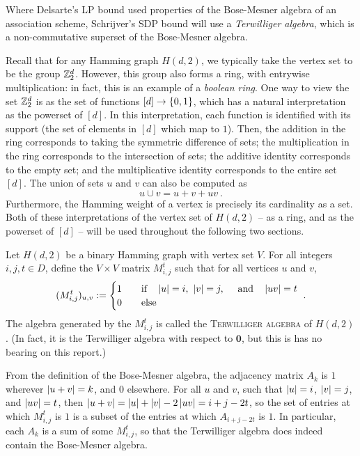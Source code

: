 \documentclass{report}
\newcommand{\wt}[1]{\abs{ #1 }}
\newcommand{\vzero}{\mathbf{0}}
\newcommand{\Mijt}{M_{i, j}^t}
\begin{document}
    Where Delsarte's LP bound used properties of the Bose-Mesner algebra of an
    association scheme, Schrijver's SDP bound will use a \textit{Terwilliger
    algebra}, which is a non-commutative superset of the Bose-Mesner algebra.

    Recall that for any Hamming graph $H(d, 2)$, we typically take the vertex
    set to be the group $\mathbb{Z}_2^d$.  However, this group also forms a ring, with
    entrywise multiplication: in fact, this is an example of a \textit{boolean
    ring}.  One way to view the set $\mathbb{Z}_2^d$ is as the set of functions $[d] \to
    \left\lbrace 0, 1 \right\rbrace$, which has a natural interpretation as the powerset of $[d]$.
    In this interpretation, each function is identified with its support (the
    set of elements in $[d]$ which map to $1$).  Then, the addition in the ring
    corresponds to taking the symmetric difference of sets; the multiplication
    in the ring corresponds to the intersection of sets; the additive identity
    corresponds to the empty set; and the multiplicative identity corresponds to
    the entire set $[d]$.  The union of sets $u$ and $v$ can also be computed as
    $$
      u \cup v = u + v + uv \ .
    $$
    Furthermore, the Hamming weight of a vertex is precisely its cardinality as
    a set.  Both of these interpretations of the vertex set of $H(d, 2)$ -- as a
    ring, and as the powerset of $[d]$ -- will be used throughout the following
    two sections.

    \begin{defn}
      Let $H(d, 2)$ be a binary Hamming graph with vertex set $V$.  For all
      integers $i, j, t \in D$, define the $V \times V$ matrix $\Mijt$ such that
      for all vertices $u$ and $v$,
      $$
        (\Mijt)_{u, v} :=
        \begin{cases}
          1 & \If \wt{u} = i,\ \wt{v} = j,\ \And \wt{uv} = t \\
          0 & \Else
        \end{cases} \ .
      $$
      The algebra generated by the $\Mijt$ is called the \textsc{Terwilliger
      algebra} of $H(d, 2)$.  (In fact, it is the Terwilliger algebra with
      respect to $\vzero$, but this is has no bearing on this report.)
    \end{defn}

    From the definition of the Bose-Mesner algebra, the adjacency matrix $A_k$
    is $1$ wherever $\wt{u+v} = k$, and $0$ elsewhere.  For all $u$ and $v$,
    such that $\wt{u} = i$, $\wt{v} = j$, and $\wt{uv} = t$, then $\wt{u+v} =
    \wt{u} + \wt{v} - 2\wt{uv} = i + j - 2t$, so the set of entries at which
    $\Mijt$ is $1$ is a subset of the entries at which $A_{i+j-2t}$ is $1$.  In
    particular, each $A_k$ is a sum of some $\Mijt$, so that the Terwilliger
    algebra does indeed contain the Bose-Mesner algebra.
\end{document}
